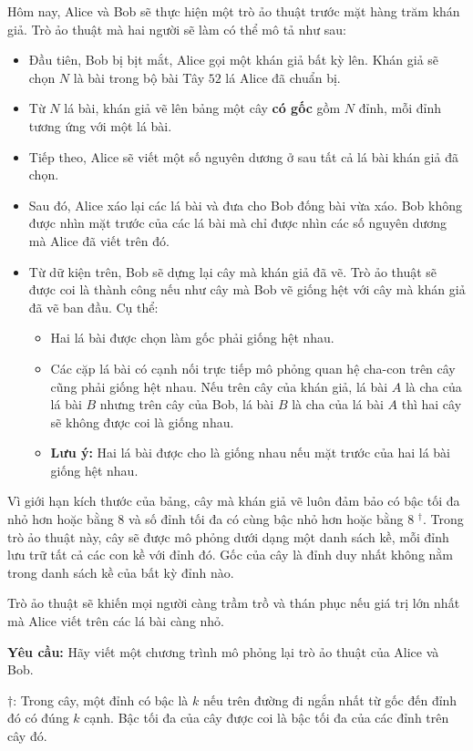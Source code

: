 Hôm nay, Alice và Bob sẽ thực hiện một trò ảo thuật trước mặt hàng trăm khán giả. Trò ảo thuật mà hai người sẽ làm có thể mô tả như sau:
\begin{itemize}
   \item Đầu tiên, Bob bị bịt mắt, Alice gọi một khán giả bất kỳ lên. Khán giả sẽ chọn $N$ là bài trong bộ bài Tây $52$ lá Alice đã chuẩn bị.
   \item Từ $N$ lá bài, khán giả vẽ lên bảng một cây \textbf{có gốc} gồm $N$ đỉnh, mỗi đỉnh tương ứng với một lá bài.
   \item Tiếp theo, Alice sẽ viết một số nguyên dương ở sau tất cả lá bài khán giả đã chọn.
   \item Sau đó, Alice xáo lại các lá bài và đưa cho Bob đống bài vừa xáo. Bob không được nhìn mặt trước của các lá bài mà chỉ được nhìn các số nguyên dương mà Alice đã viết trên đó.
   \item Từ dữ kiện trên, Bob sẽ dựng lại cây mà khán giả đã vẽ. Trò ảo thuật sẽ được coi là thành công nếu như cây mà Bob vẽ giống hệt với cây mà khán giả đã vẽ ban đầu. Cụ thể:
   \begin{itemize}
      \item Hai lá bài được chọn làm gốc phải giống hệt nhau.
      \item Các cặp lá bài có cạnh nối trực tiếp mô phỏng quan hệ cha-con trên cây cũng phải giống hệt nhau. Nếu trên cây của khán giả, lá bài $A$ là cha của lá bài $B$ nhưng trên cây của Bob, lá bài $B$ là cha của lá bài $A$ thì hai cây sẽ không được coi là giống nhau.
      \item \textbf{Lưu ý:} Hai lá bài được cho là giống nhau nếu mặt trước của hai lá bài giống hệt nhau.
   \end{itemize}
\end{itemize}

Vì giới hạn kích thước của bảng, cây mà khán giả vẽ luôn đảm bảo có bậc tối đa nhỏ hơn hoặc bằng $8$ và số đỉnh tối đa có cùng bậc nhỏ hơn hoặc bằng $8$ $^\dagger$. Trong trò ảo thuật này, cây sẽ được mô phỏng dưới dạng một danh sách kề, mỗi đỉnh lưu trữ tất cả các con kề với đỉnh đó. Gốc của cây là đỉnh duy nhất không nằm trong danh sách kề của bất kỳ đỉnh nào.

Trò ảo thuật sẽ khiến mọi người càng trầm trồ và thán phục nếu giá trị lớn nhất mà Alice viết trên các lá bài càng nhỏ.

\textbf{Yêu cầu:} Hãy viết một chương trình mô phỏng lại trò ảo thuật của Alice và Bob.

$\dagger$: Trong cây, một đỉnh có bậc là $k$ nếu trên đường đi ngắn nhất từ gốc đến đỉnh đó có đúng $k$ cạnh. Bậc tối đa của cây được coi là bậc tối đa của các đỉnh trên cây đó.